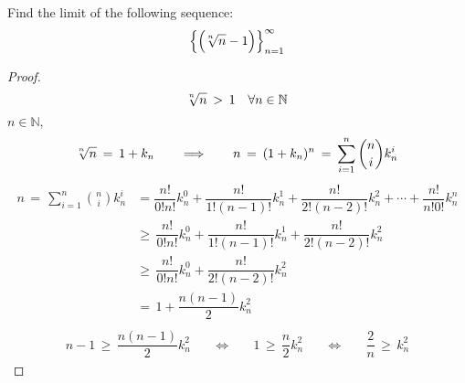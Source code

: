 \begin{exercise}
Find the limit of the following sequence:
\begin{align*}
    \Big\{\Big(\sqrt[\leftroot{2}\uproot{2}n]{n} - 1\Big)\Big\}_{n=1}^{\infty}
\end{align*}
\begin{proof}
    \begin{align*}
        \sqrt[\leftroot{2}\uproot{2}n]{n} \hspace{2pt} > \hspace{2pt} 1 \hspace{10pt} \forall n \in \mathbb{N}
    \end{align*}
     $n \in \mathbb{N},$ 
    \begin{align*}
        \sqrt[\leftroot{2}\uproot{2}n]{n} \hspace{2pt} = \hspace{2pt} 1 + k_{n} \hspace{20pt} \Longrightarrow \hspace{20pt} n \hspace{2pt} = \hspace{2pt} (1 + k_{n})^n \hspace{2pt} = \hspace{2pt} \sum_{i = 1}^{n} \binom{n}{i} k_{n}^{i}
    \end{align*}
    \begin{align*}
        n \hspace{2pt} = \hspace{2pt} \sum_{i = 1}^{n} \binom{n}{i} k_{n}^{i} &= \dfrac{n!}{0!n!}k_{n}^{0} + \dfrac{n!}{1!(n-1)!}k_{n}^{1} + \dfrac{n!}{2!(n-2)!}k_{n}^{2} + \cdots + \dfrac{n!}{n!0!}k_{n}^{n} \\[1ex]
        &\geq \hspace{2pt} \dfrac{n!}{0!n!}k_{n}^{0} + \dfrac{n!}{1!(n-1)!}k_{n}^{1} + \dfrac{n!}{2!(n-2)!}k_{n}^{2} \\[1ex]
        &\geq \hspace{2pt} \dfrac{n!}{0!n!}k_{n}^{0}  + \dfrac{n!}{2!(n-2)!}k_{n}^{2} \\[1ex]
        &= \hspace{2pt} 1 + \dfrac{n(n-1)}{2}k_{n}^{2} \\[1ex]
    \end{align*}
    \begin{align*}
        n - 1 \hspace{2pt} \geq \hspace{2pt} \dfrac{n(n-1)}{2}k_{n}^{2} \hspace{20pt} \Longleftrightarrow \hspace{20pt} 1 \hspace{2pt} \geq \hspace{2pt} \dfrac{n}{2}k_{n}^{2} \hspace{20pt} \Longleftrightarrow \hspace{20pt} \dfrac{2}{n} \hspace{2pt} \geq \hspace{2pt} k_{n}^{2}

\end{align*}
\end{proof}
\end{exercise}
